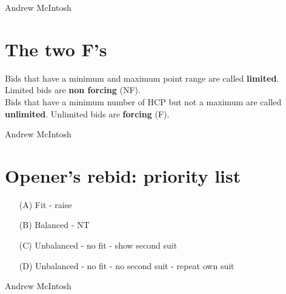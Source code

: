\documentclass[14pt]{extarticle}
\begin{document}
\vspace*{\fill}
\begin{flushbottom}
 \begin{center}
 \tiny
 \textcopyright Andrew McIntosh
\end{center}
\end{flushbottom}



\newpage
\addtocounter{page}{2}
\vspace*{\fill}
\begingroup
\centering
\section*{The two F's}
\endgroup
\noindent Bids that have a minimum and maximum point range are called \textbf{limited}. Limited bids are \textbf{non forcing} (NF).\\

\noindent Bids that have a minimum number of HCP but not a maximum  are called \textbf{unlimited}. Unlimited bids are \textbf{forcing} (F).

\vspace*{\fill}
\begin{flushbottom}
 \begin{center}
 \tiny
 \textcopyright Andrew McIntosh
\end{center}
\end{flushbottom}


\newpage
\vspace*{\fill}
\begingroup
\centering
\section*{Opener's rebid: priority list}
\endgroup
\begin{itemize}
\item[(A)] Fit - raise
\item[(B)] Balanced - NT
\item[(C)] Unbalanced - no fit - show second suit
\item[(D)] Unbalanced - no fit - no second suit - repeat own suit
\end{itemize}


\vspace*{\fill}
\begin{flushbottom}
 \begin{center}
 \tiny
 \textcopyright Andrew McIntosh
\end{center}
\end{flushbottom}
\end{document}
